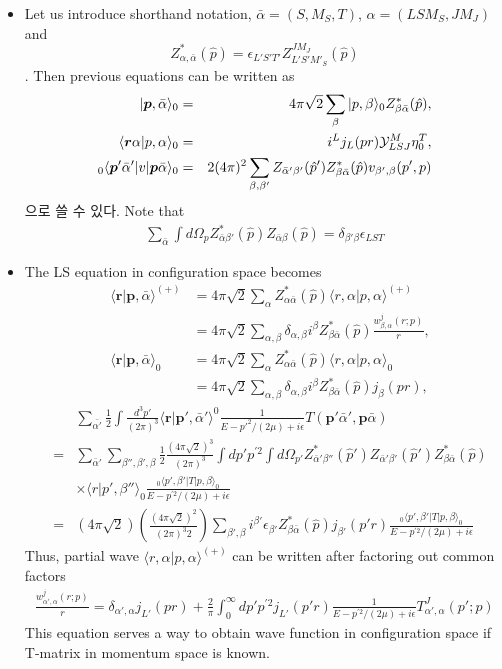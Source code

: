 \documentclass[10pt]{article}
\def\bm{\boldsymbol}
\newcommand{\bea}{\begin{eqnarray}}
\newcommand{\eea}{\end{eqnarray}}
\newcommand{\no}{\nonumber \\}
\def\vp{{\bm p}}
\def\vr{{\bm r}}
\def\la{\langle}
\def\ra{\rangle}
\begin{document}
\begin{itemize}
\item Let us introduce shorthand notation,
$\bar{\alpha}=(S,M_S,T)$, $\alpha=(L S M_S ,J M_J)$
and $$Z^*_{\alpha, \bar{\alpha}}(\hat{p})
=\epsilon_{L'S'T'}Z^{J M_J}_{L'S'M'_S}(\hat{p})$$
. Then previous equations can be written as
\bea
|\vp,\bar{\alpha}\ra_0&=&4\pi\sqrt{2}
     \sum_{\beta}|p,\beta\ra_0 Z^*_{\beta \bar{\alpha}}(\hat{p}),\no
\la \vr\alpha|p,\alpha\ra_0&=& i^L j_L(pr) {\cal Y}^M_{LSJ}\eta^T_0,\no
{}_0\la \vp'\bar{\alpha}'|v|\vp \bar{\alpha}\ra_0
&=&2 (4\pi)^2\sum_{\beta,\beta'}
  Z_{\bar{\alpha}'\beta'}(\hat{p}') Z^*_{\beta \bar{\alpha}}(\hat{p})
       v_{\beta',\beta}(p',p)     
\eea 
으로 쓸 수 있다. Note that
\bea
\sum_{\bar{\alpha}} \int d\Omega_{p} 
Z_{\bar{\alpha}\beta'}^*(\hat{p}) Z_{\bar{\alpha}\beta}(\hat{p})
=\delta_{\beta'\beta}\epsilon_{LST}
\eea
\item The LS equation in configuration space becomes
\bea
&\la\vr|\vp,\bar{\alpha}\ra^{(+)}&=4\pi\sqrt{2}\sum_{\alpha} Z^*_{\alpha\bar{\alpha}}(\hat{p}) \la r,\alpha|p,\alpha\ra^{(+)} \no
& & =4\pi\sqrt{2}\sum_{\alpha,\beta} \delta_{\alpha,\beta}
    i^{\beta} Z^*_{\beta \bar{\alpha}}(\hat{p}) 
    \frac{w^j_{\beta,\alpha}(r;p)}{r}  ,\no
&\la\vr|\vp,\bar{\alpha}\ra_0 &=4\pi\sqrt{2}\sum_{\alpha} Z^*_{\alpha\bar{\alpha}}(\hat{p}) \la r,\alpha|p,\alpha\ra_0 \no
& &=4\pi\sqrt{2}\sum_{\alpha,\beta} \delta_{\alpha,\beta}
    i^{\beta} Z^*_{\beta \bar{\alpha}}(\hat{p}) 
    j_{\beta}(pr),
\eea
\bea
& &\sum_{\bar{\alpha'}}\frac{1}{2}
 \int \frac{d^3p'}{(2\pi)^3}\la \vr|\vp',\bar{\alpha}'\ra^0
 \frac{1}{E-p'^2/(2\mu)+i\epsilon} T(\vp'\bar{\alpha}',\vp \bar{\alpha})\no
&=&\sum_{\bar{\alpha}'}\sum_{\beta'',\beta',\beta}
 \frac{1}{2}\frac{(4\pi\sqrt{2})^3}{(2\pi)^3}\int dp' p^{'2}\int d\Omega_{p'}
  Z^*_{\bar{\alpha}'\beta''}(\hat{p}')
 Z_{\bar{\alpha}'\beta'}(\hat{p}')Z_{\beta\bar{\alpha}}^*(\hat{p})
  \no & &\times
 \la r|p',\beta''\ra_0 \frac{{}_0\la p',\beta'|T|p,\beta\ra_0}{E-p^{'2}/(2\mu)+i\epsilon}\no
&=&(4\pi\sqrt{2})(\frac{(4\pi\sqrt{2})^2}{(2\pi)^3 2})
  \sum_{\beta',\beta} i^{\beta'}
  \epsilon_{\beta'} Z^*_{\beta\bar{\alpha}}(\hat{p})
  j_{\beta'}(p'r) \frac{{}_0\la p',\beta'|T|p,\beta\ra_0}{E-p^{'2}/(2\mu)+i\epsilon}
\eea
Thus, partial wave $\la r,\alpha|p,\alpha\ra^{(+)}$ can be written 
after factoring out common factors
\bea
\frac{w_{\alpha',\alpha}^j(r;p)}{r}
=\delta_{\alpha',\alpha}j_{L'}(pr)
 +\frac{2}{\pi}\int_0^\infty dp' p^{'2} j_{L'}(p'r)
 \frac{1}{E-p^{'2}/(2\mu)+i\epsilon} T^J_{\alpha',\alpha}(p';p)
\eea
This equation serves a way to obtain wave function
in configuration space if T-matrix in momentum space is known.

\end{itemize}
\end{document}
